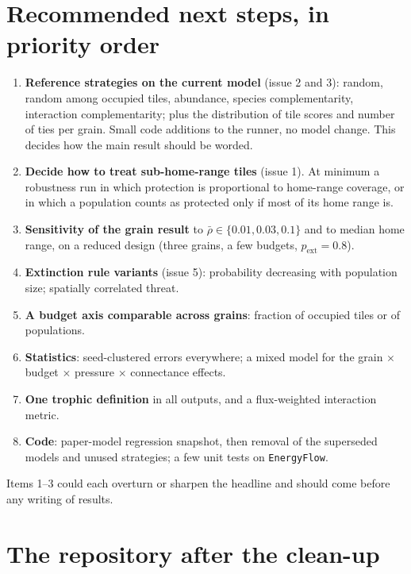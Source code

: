 \documentclass[11pt,a4paper]{article}
\newcommand{\code}[1]{\texttt{\small #1}}
\newcommand{\rhobar}{\bar{\rho}}
\begin{document}
\section{Recommended next steps, in priority order}\label{sec:todo}

\begin{enumerate}
\item \textbf{Reference strategies on the current model} (issue 2 and 3): random, random among occupied
tiles, abundance, species complementarity, interaction complementarity; plus the distribution of tile
scores and number of ties per grain. Small code additions to the runner, no model change. This decides how
the main result should be worded.
\item \textbf{Decide how to treat sub-home-range tiles} (issue 1). At minimum a robustness run in which
protection is proportional to home-range coverage, or in which a population counts as protected only if
most of its home range is.
\item \textbf{Sensitivity of the grain result} to $\rhobar\in\{0.01,0.03,0.1\}$ and to median home range, on
a reduced design (three grains, a few budgets, $p_\text{ext}=0.8$).
\item \textbf{Extinction rule variants} (issue 5): probability decreasing with population size; spatially
correlated threat.
\item \textbf{A budget axis comparable across grains}: fraction of occupied tiles or of populations.
\item \textbf{Statistics}: seed-clustered errors everywhere; a mixed model for the grain $\times$ budget
$\times$ pressure $\times$ connectance effects.
\item \textbf{One trophic definition} in all outputs, and a flux-weighted interaction metric.
\item \textbf{Code}: paper-model regression snapshot, then removal of the superseded models and unused
strategies; a few unit tests on \code{EnergyFlow}.
\end{enumerate}
Items 1--3 could each overturn or sharpen the headline and should come before any writing of results.

\section{The repository after the clean-up}\label{sec:repo}
\end{document}
